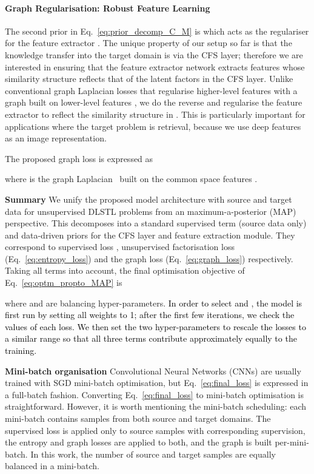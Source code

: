 \documentclass[letterpaper]{article} \usepackage{aaai19}  \usepackage{times}  \usepackage{helvet}  \usepackage{courier}  \usepackage{url}  \usepackage{graphicx}
\newcommand{\keypoint}[1]{\noindent\textbf{#1}\quad}
\begin{document}
\paragraph{Graph Regularisation: Robust Feature Learning}
The second prior in Eq.~\ref{eq:prior_decomp_C_M} is  which acts as the regulariser for the feature extractor . The unique property of our setup so far is that the knowledge transfer into the target domain is via the CFS layer; therefore we are interested in ensuring that the feature extractor network extracts features whose similarity structure reflects that of the latent factors in the CFS layer. Unlike conventional graph Laplacian losses that regularise higher-level features with a graph built on lower-level features \cite{belkin2006laprlsSSL,zhu2006semi}, we do the reverse and regularise the feature extractor  to reflect the similarity structure in .  This is particularly important for applications where the target problem is retrieval, because we use deep features  as an image representation.

The proposed graph loss is expressed as

where   is the graph Laplacian~\cite{cai2011graph} built on the common space features .


\keypoint{Summary}
We unify the proposed model architecture  with source  and target   data for unsupervised DLSTL problems from an maximum-a-posterior (MAP) perspective. This decomposes into a standard supervised term  (source data only) and data-driven priors for the CFS layer and feature extraction module. 
They correspond to supervised loss , unsupervised factorisation loss (Eq.~\ref{eq:entropy_loss}) and the graph loss (Eq.~\ref{eq:graph_loss}) respectively.
Taking all terms into account, the final optimisation objective of Eq.~\ref{eq:optm_propto_MAP} is 

where  and  are balancing hyper-parameters.
\textcolor{black}{In order to select  and , the model is first run by setting all weights to 1;  after the first few iterations, we check the values of each loss. We then set the two hyper-parameters to rescale the losses to a similar range so that all three terms contribute approximately equally to the training.}

\keypoint{Mini-batch organisation} Convolutional Neural Networks (CNNs) are usually trained with SGD mini-batch optimisation, but Eq.~\ref{eq:final_loss} is expressed in a full-batch fashion. Converting Eq.~\ref{eq:final_loss} to mini-batch optimisation is straightforward. 
However, it is worth mentioning the mini-batch scheduling: each mini-batch contains samples from both source and target domains. The supervised loss is applied only to source samples with corresponding supervision, the entropy and graph losses are applied to both, and the graph is built per-mini-batch. In this work, the number of source and target samples are equally balanced in a mini-batch.
 
\end{document}
